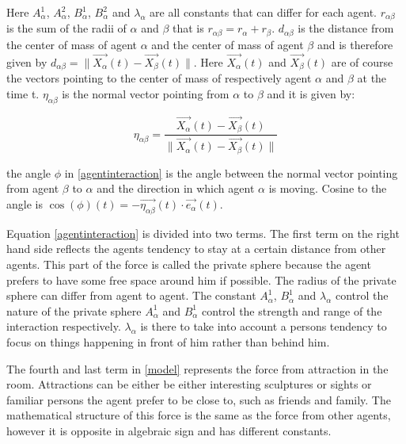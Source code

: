 Here $A_{\alpha}^{1}$, $A_{\alpha}^{2}$, $B_{\alpha}^{1}$, $B_{\alpha}^{2}$ 
and $\lambda_{\alpha}$ are all constants that can differ for each agent. 
$r_{\alpha \beta}$ is the sum of the radii of $\alpha$ and $\beta$ that is 
$r_{\alpha \beta} = r_{\alpha} + r_{\beta}$. $d_{\alpha \beta}$ is the 
distance from the center of mass of agent $\alpha$ and the center of mass of 
agent $\beta$ and is therefore given by $d_{\alpha \beta} = 
\|\vec{X_{\alpha}}\left( t \right) - \vec{X_{\beta}}\left( t \right) \|$. Here 
$\vec{X_{\alpha}}\left( t \right)$ and $\vec{X_{\beta}}\left( t \right)$ are 
of course the vectors pointing to the center of mass of respectively agent 
$\alpha$ and $\beta$ at the time t. $\eta_{\alpha \beta}$ is the normal vector 
pointing from $\alpha$ to $\beta$ and it is given by:

\begin{equation}
    \eta_{\alpha \beta} =
        \frac{\vec{X_{\alpha}}(t) - \vec{X_{\beta}}(t)}
             {\|\vec{X_{\alpha}}(t) - \vec{X_{\beta}}(t) \|}
\end{equation}

the angle $\phi$ in \eqref{agentinteraction} is the angle between the normal 
vector pointing from agent $\beta$ to $\alpha$ and the direction in which 
agent $\alpha$ is moving. Cosine to the angle is $\cos \left( \phi 
\right)\left( t \right) = - \vec{\eta_{\alpha \beta}}\left( t \right) \cdot 
\vec{e_{\alpha}}\left( t \right)$.

Equation \eqref{agentinteraction} is divided into two terms. The first term on 
the right hand side reflects the agents tendency to stay at a certain distance 
from other agents. This part of the force is called the private sphere because 
the agent prefers to have some free space around him if possible. The radius 
of the private sphere can differ from agent to agent. The constant 
$A_{\alpha}^{1}$, $B_{\alpha}^{1}$ and $\lambda_{\alpha}$ control the nature 
of the private sphere $A_{\alpha}^1$ and $B_{\alpha}^1$ control the strength 
and range of the interaction respectively. $\lambda_{\alpha}$ is there to take 
into account a persons tendency to focus on things happening in front of him 
rather than behind him.


The fourth and last term in \eqref{model} represents the force from attraction 
in the room. Attractions can be either be either interesting sculptures or 
sights or familiar persons the agent prefer to be close to, such as friends 
and family. The mathematical structure of this force is the same as the force 
from other agents, however it is opposite in algebraic sign and has different 
constants. 

